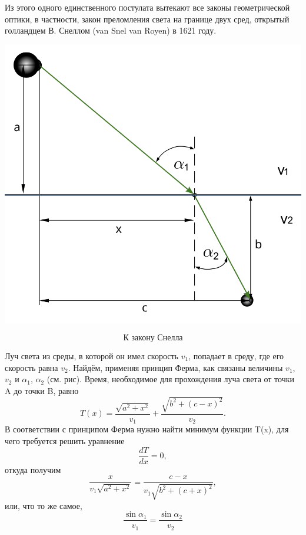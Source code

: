 \documentclass[a4paper, 12pt]{article}
\begin{document}
Из этого одного единственного постулата вытекают все законы геометрической оптики, в частности, закон преломления света на границе двух сред, открытый голландцем В. Снеллом (van Snel van Royen) в 1621 году.
\begin{center}
\includegraphics[scale=0.5]{snell}
\end{center}
\[\textit{К закону Снелла}\]

Луч света из среды, в которой он имел скорость $v_1$, попадает в среду, где его скорость равна $v_2$. Найдём, применяя принцип Ферма, как связаны величины $v_1$, $v_2$ и $\alpha_1$, $\alpha_2$ (см. рис). Время, необходимое для прохождения луча света от точки A до точки B, равно 
\[T(x) = \frac{\sqrt{a^2 + x^2}}{v_1} + \frac{\sqrt{b^2 + (c - x)^2}}{v_2}.\]
В соответствии с принципом Ферма нужно найти минимум функции T(x), для чего требуется решить уравнение 
\[\frac{dT}{dx} = 0,\]
откуда получим
\[\frac{x}{v_1\sqrt{a^2 + x^2}} = \frac{c - x}{v_1\sqrt{b^2 + (c + x)^2}},\]
или, что то же самое,
\[\frac{\sin\alpha_1}{v_1} = \frac{\sin\alpha_2}{v_2}\]
\end{document}

